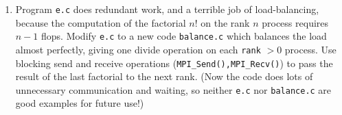 \begin{enumerate}
\item \label{exer:gs:balance} Program \texttt{e.c} does redundant work, and a terrible job of load-balancing, because the computation of the factorial $n!$ on the rank $n$ process requires $n-1$ flops.  Modify \texttt{e.c} to a new code \texttt{balance.c} which balances the load almost perfectly, giving one divide operation on each \texttt{rank} $>0$ process.  Use blocking send and receive operations (\texttt{MPI\_Send(),MPI\_Recv()}) to pass the result of the last factorial to the next rank.  (Now the code does lots of unnecessary communication and waiting, so neither \texttt{e.c} nor \texttt{balance.c} are good examples for future use!)

\end{enumerate}
